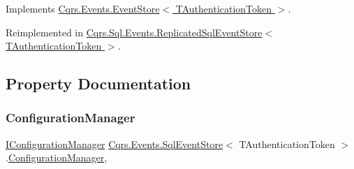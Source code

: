 Implements \hyperlink{classCqrs_1_1Events_1_1EventStore_aedb71ca0ddf21220e323bc60ad7508cd_aedb71ca0ddf21220e323bc60ad7508cd}{Cqrs.\+Events.\+Event\+Store$<$ T\+Authentication\+Token $>$}.



Reimplemented in \hyperlink{classCqrs_1_1Sql_1_1Events_1_1ReplicatedSqlEventStore_a51c9b1329327e456a251aa2d910fc7ae_a51c9b1329327e456a251aa2d910fc7ae}{Cqrs.\+Sql.\+Events.\+Replicated\+Sql\+Event\+Store$<$ T\+Authentication\+Token $>$}.



\subsection{Property Documentation}
\mbox{\label{classCqrs_1_1Events_1_1SqlEventStore_ac74de2a6905b38d167bcb23055e19b3d_ac74de2a6905b38d167bcb23055e19b3d}} 
\subsubsection{\texorpdfstring{Configuration\+Manager}{ConfigurationManager}}
{\footnotesize\ttfamily \hyperlink{interfaceCqrs_1_1Configuration_1_1IConfigurationManager}{I\+Configuration\+Manager} \hyperlink{classCqrs_1_1Events_1_1SqlEventStore}{Cqrs.\+Events.\+Sql\+Event\+Store}$<$ T\+Authentication\+Token $>$.\hyperlink{classCqrs_1_1Configuration_1_1ConfigurationManager}{Configuration\+Manager}\hspace{0.3cm}{\ttfamily [get]}, {\ttfamily [protected]}}

